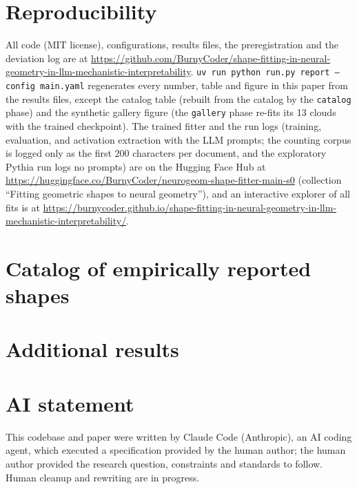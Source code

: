 \documentclass[10pt]{article}
\begin{document}
\section*{Reproducibility}
All code (MIT license), configurations, results files, the preregistration and the deviation log are at \url{https://github.com/BurnyCoder/shape-fitting-in-neural-geometry-in-llm-mechanistic-interpretability}. \texttt{uv run python run.py report --config main.yaml} regenerates every number, table and figure in this paper from the results files, except the catalog table (rebuilt from the catalog by the \texttt{catalog} phase) and the synthetic gallery figure (the \texttt{gallery} phase re-fits its 13 clouds with the trained checkpoint). The trained fitter and the run logs (training, evaluation, and activation extraction with the LLM prompts; the counting corpus is logged only as the first 200 characters per document, and the exploratory Pythia run logs no prompts) are on the Hugging Face Hub at \url{https://huggingface.co/BurnyCoder/neurogeom-shape-fitter-main-s0} (collection ``Fitting geometric shapes to neural geometry''), and an interactive explorer of all fits is at \url{https://burnycoder.github.io/shape-fitting-in-neural-geometry-in-llm-mechanistic-interpretability/}.




\appendix
\section{Catalog of empirically reported shapes}
\label{app:catalog}

\section{Additional results}


\section*{AI statement}
This codebase and paper were written by Claude Code (Anthropic), an AI coding agent, which executed a specification provided by the human author; the human author provided the research question, constraints and standards to follow. Human cleanup and rewriting are in progress.
\end{document}
